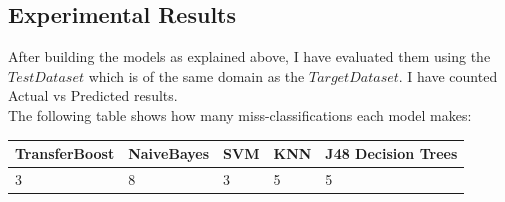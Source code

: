 \documentclass[a4paper,12pt, english]{article}
\begin{document}
\subsection{Experimental Results}
After building the models as explained above, I have evaluated them using the $Test Dataset$ which is of the same domain as the $Target Dataset$. I have counted Actual vs Predicted results.\\
The following table shows how many miss-classifications each model makes:\\ 
\begin{center}
    \begin{tabular}{ | l | l | l | p{5cm} | l |}
    \hline
    TransferBoost & NaiveBayes & SVM & KNN & J48 Decision Trees \\ \hline
    3 & 8 & 3 & 5 & 5\\
    \hline
    \end{tabular}       
\end{center}
\end{document}
